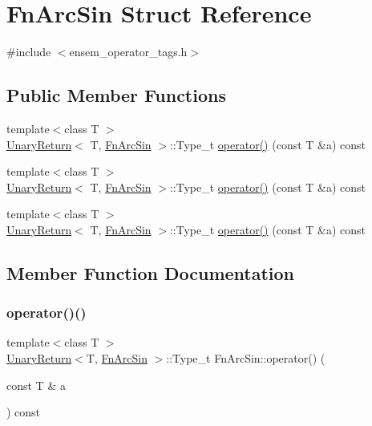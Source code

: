 \hypertarget{structFnArcSin}{}\section{Fn\+Arc\+Sin Struct Reference}
\label{structFnArcSin}


{\ttfamily \#include $<$ensem\+\_\+operator\+\_\+tags.\+h$>$}

\subsection*{Public Member Functions}
\begin{DoxyCompactItemize}
\item 
{\footnotesize template$<$class T $>$ }\\\mbox{\hyperlink{structUnaryReturn}{Unary\+Return}}$<$ T, \mbox{\hyperlink{structFnArcSin}{Fn\+Arc\+Sin}} $>$\+::Type\+\_\+t \mbox{\hyperlink{structFnArcSin_a12cc5b8e1ae14e2bdb4a9ec3be431874}{operator()}} (const T \&a) const
\item 
{\footnotesize template$<$class T $>$ }\\\mbox{\hyperlink{structUnaryReturn}{Unary\+Return}}$<$ T, \mbox{\hyperlink{structFnArcSin}{Fn\+Arc\+Sin}} $>$\+::Type\+\_\+t \mbox{\hyperlink{structFnArcSin_a12cc5b8e1ae14e2bdb4a9ec3be431874}{operator()}} (const T \&a) const
\item 
{\footnotesize template$<$class T $>$ }\\\mbox{\hyperlink{structUnaryReturn}{Unary\+Return}}$<$ T, \mbox{\hyperlink{structFnArcSin}{Fn\+Arc\+Sin}} $>$\+::Type\+\_\+t \mbox{\hyperlink{structFnArcSin_a12cc5b8e1ae14e2bdb4a9ec3be431874}{operator()}} (const T \&a) const
\end{DoxyCompactItemize}


\subsection{Member Function Documentation}
\mbox{\label{structFnArcSin_a12cc5b8e1ae14e2bdb4a9ec3be431874}} 
\subsubsection{\texorpdfstring{operator()()}{operator()()}\hspace{0.1cm}{\footnotesize\ttfamily [1/3]}}
{\footnotesize\ttfamily template$<$class T $>$ \\
\mbox{\hyperlink{structUnaryReturn}{Unary\+Return}}$<$T, \mbox{\hyperlink{structFnArcSin}{Fn\+Arc\+Sin}} $>$\+::Type\+\_\+t Fn\+Arc\+Sin\+::operator() (\begin{DoxyParamCaption}\item[{const T \&}]{a }\end{DoxyParamCaption}) const\hspace{0.3cm}{\ttfamily [inline]}}

